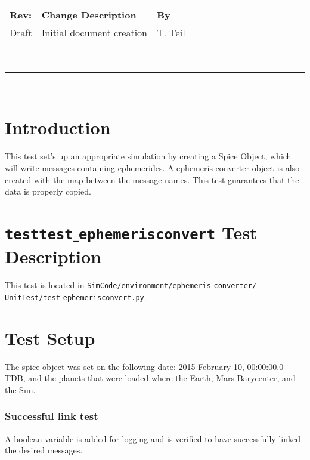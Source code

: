 \documentclass[]{BasiliskReportMemo}
\begin{document}
\makeCover
%
%
\pagestyle{empty}
{\renewcommand{\arraystretch}{1.1}
\noindent
\begin{longtable}{|p{0.5in}|p{4.5in}|p{1.14in}|}
\hline
{\bfseries Rev}: & {\bfseries Change Description} & {\bfseries By} \\
\hline
Draft & Initial document creation & T. Teil \\
\hline

\end{longtable}
}

\newpage
\setcounter{page}{1}
\pagestyle{fancy}

\tableofcontents
~\\ \hrule ~\\



\section{Introduction}
This test set's up an appropriate simulation by creating a Spice Object, which will write messages containing ephemerides. A ephemeris converter object is also created with the map between the message names. This test guarantees that the data is properly copied.


\section{{\tt test\textunderscore test$\_$ephemerisconvert} Test Description}

This test is located in {\tt SimCode/environment/ephemeris$\_$converter/$\_$UnitTest/test$\_$ephemerisconvert.py}. \par

\section{Test Setup}

The spice object was set on the following date: 2015 February 10, 00:00:00.0 TDB, and the planets that were loaded where the Earth, Mars Barycenter, and the Sun.

\subsubsection*{Successful link test}

A boolean variable is added for logging and is verified to have successfully linked the desired messages.
\end{document}
